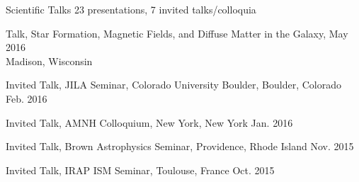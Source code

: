 \documentclass{resume_clark} %
\begin{document}
\begin{rSection}{Scientific Talks}
23 presentations, 7 invited talks/colloquia 
\begin{etaremune}




\item Talk, Star Formation, Magnetic Fields, and Diffuse Matter in the Galaxy, \hfill{May 2016}\\
Madison, Wisconsin 

\item Invited Talk, JILA Seminar, Colorado University Boulder, Boulder, Colorado \hfill {Feb. 2016}

\item Invited Talk, AMNH Colloquium, New York, New York \hfill {Jan. 2016}

\item Invited Talk, Brown Astrophysics Seminar, Providence, Rhode Island \hfill {Nov. 2015}

\item Invited Talk, IRAP ISM Seminar, Toulouse, France \hfill{Oct. 2015}


\end{etaremune}
\end{rSection}
\end{document}
